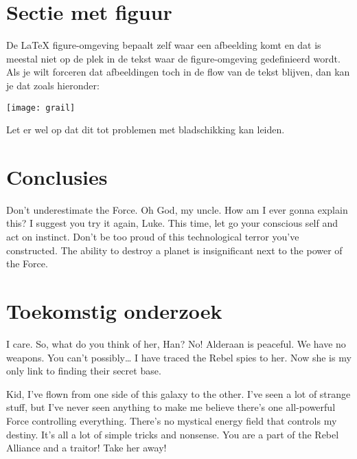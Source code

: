\documentclass[a0,portrait]{hogent-poster}
\begin{document}
\begin{multicols}{2}
\section{Sectie met figuur}

De {\LaTeX} figure-omgeving bepaalt zelf waar een afbeelding komt en dat is meestal niet op de plek in de tekst waar de figure-omgeving gedefinieerd wordt. Als je wilt forceren dat afbeeldingen toch in de flow van de tekst blijven, dan kan je dat zoals hieronder:

\begin{center}
  \captionsetup{type=figure}
  \texttt{[image: grail]}
\end{center}

Let er wel op dat dit tot problemen met bladschikking kan leiden.

\section{Conclusies}

Don't underestimate the Force. Oh God, my uncle. How am I ever gonna explain this? I suggest you try it again, Luke. This time, let go your conscious self and act on instinct. Don't be too proud of this technological terror you've constructed. The ability to destroy a planet is insignificant next to the power of the Force.

\section{Toekomstig onderzoek}

I care. So, what do you think of her, Han? No! Alderaan is peaceful. We have no weapons. You can't possibly… I have traced the Rebel spies to her. Now she is my only link to finding their secret base.

Kid, I've flown from one side of this galaxy to the other. I've seen a lot of strange stuff, but I've never seen anything to make me believe there's one all-powerful Force controlling everything. There's no mystical energy field that controls my destiny. It's all a lot of simple tricks and nonsense. You are a part of the Rebel Alliance and a traitor! Take her away! 

\end{multicols}
\end{document}
